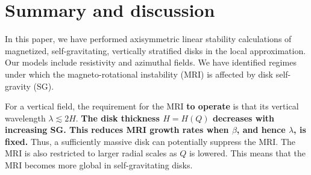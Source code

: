 \section{Summary and discussion}\label{summary}
In this paper, we have performed axisymmetric linear stability
calculations of magnetized, self-gravitating, vertically stratified
disks in the local approximation. Our models include resistivity and
azimuthal fields. We have identified regimes under which the
magneto-rotational instability (MRI) is affected by disk self-gravity
(SG).   


For a vertical field, the requirement for the MRI {\bf to operate} is that   
its vertical wavelength $\lambda \lesssim 2H$. 
{\bf 
The disk thickness $H=H(Q)$ decreases with increasing SG. This 
reduces MRI growth rates when 
$\beta$, and hence $\lambda$, is fixed.  
}
Thus, a sufficiently massive disk can potentially suppress the MRI. 
The MRI is also restricted to larger radial 
scales as $Q$ is lowered. This means that the MRI becomes more global
in self-gravitating disks. 

